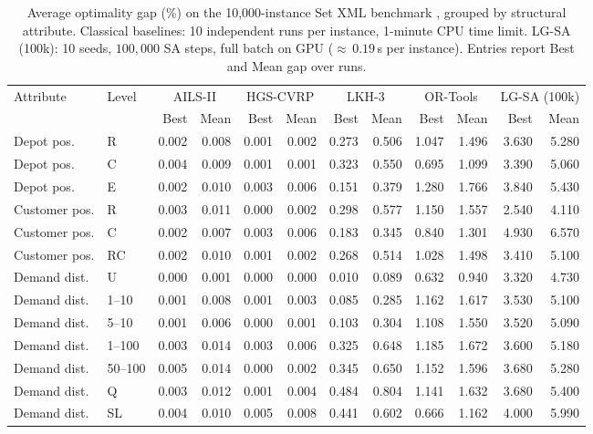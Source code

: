 \documentclass[letterpaper]{article} %
\begin{document}
\begin{table}[t]
\centering
\caption{Average optimality gap (\%) on the 10,000-instance Set XML benchmark \citep{queiroga_10000_nodate}, grouped by structural attribute. Classical baselines: 10 independent runs per instance, 1-minute CPU time limit. LG-SA (100k): 10 seeds, $100{,}000$ SA steps, full batch on GPU ($\approx$\,$0.19$\,s per instance). Entries report Best and Mean gap over runs.}
\label{tab:xml_by_groups}
\small
\begin{tabular}{llrrrrrrrrrr}
\toprule
Attribute & Level & \multicolumn{2}{c}{AILS-II} & \multicolumn{2}{c}{HGS-CVRP} & \multicolumn{2}{c}{LKH-3} & \multicolumn{2}{c}{OR-Tools} & \multicolumn{2}{c}{LG-SA (100k)} \\
 &  & Best & Mean & Best & Mean & Best & Mean & Best & Mean & Best & Mean \\
\midrule
Depot pos. & R & 0.002 & 0.008 & 0.001 & 0.002 & 0.273 & 0.506 & 1.047 & 1.496 & 3.630 & 5.280 \\
Depot pos. & C & 0.004 & 0.009 & 0.001 & 0.001 & 0.323 & 0.550 & 0.695 & 1.099 & 3.390 & 5.060 \\
Depot pos. & E & 0.002 & 0.010 & 0.003 & 0.006 & 0.151 & 0.379 & 1.280 & 1.766 & 3.840 & 5.430 \\
Customer pos. & R & 0.003 & 0.011 & 0.000 & 0.002 & 0.298 & 0.577 & 1.150 & 1.557 & 2.540 & 4.110 \\
Customer pos. & C & 0.002 & 0.007 & 0.003 & 0.006 & 0.183 & 0.345 & 0.840 & 1.301 & 4.930 & 6.570 \\
Customer pos. & RC & 0.002 & 0.010 & 0.001 & 0.002 & 0.268 & 0.514 & 1.028 & 1.498 & 3.410 & 5.100 \\
Demand dist. & U & 0.000 & 0.001 & 0.000 & 0.000 & 0.010 & 0.089 & 0.632 & 0.940 & 3.320 & 4.730 \\
Demand dist. & 1--10 & 0.001 & 0.008 & 0.001 & 0.003 & 0.085 & 0.285 & 1.162 & 1.617 & 3.530 & 5.100 \\
Demand dist. & 5--10 & 0.001 & 0.006 & 0.000 & 0.001 & 0.103 & 0.304 & 1.108 & 1.550 & 3.520 & 5.090 \\
Demand dist. & 1--100 & 0.003 & 0.014 & 0.003 & 0.006 & 0.325 & 0.648 & 1.185 & 1.672 & 3.600 & 5.180 \\
Demand dist. & 50--100 & 0.005 & 0.014 & 0.000 & 0.002 & 0.345 & 0.650 & 1.152 & 1.596 & 3.680 & 5.280 \\
Demand dist. & Q & 0.003 & 0.012 & 0.001 & 0.004 & 0.484 & 0.804 & 1.141 & 1.632 & 3.680 & 5.400 \\
Demand dist. & SL & 0.004 & 0.010 & 0.005 & 0.008 & 0.441 & 0.602 & 0.666 & 1.162 & 4.000 & 5.990 \\

\end{tabular}
\end{table}
\end{document}
